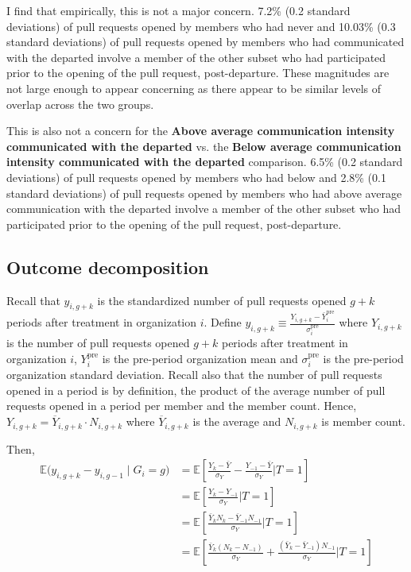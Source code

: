 \documentclass[12pt,notitlepage]{article}
\newcommand{\E}{\mathbb{E}}
\begin{document}
I find that empirically, this is not a major concern. 7.2\% (0.2 standard deviations) of pull requests opened by members who had never and 10.03\% (0.3 standard deviations) of pull requests opened by members who had communicated with the departed involve a member of the other subset who had participated prior to the opening of the pull request, post-departure. These magnitudes are not large enough to appear concerning as there appear to be similar levels of overlap across the two groups. 

This is also not a concern for the \textbf{Above average communication intensity communicated with the departed} vs. the \textbf{Below average communication intensity communicated with the departed} comparison.  6.5\% (0.2 standard deviations) of pull requests opened by members who had below and 2.8\% (0.1 standard deviations) of pull requests opened by members who had above average communication with the departed involve a member of the other subset who had participated prior to the opening of the pull request, post-departure.  


\subsection{Outcome decomposition} \label{sec:outcome_decomp}
Recall that $ y_{i, g+k} $ is the standardized number of pull requests opened $g+k$ periods after treatment in organization $i$. Define $y_{i,g+k}\equiv \frac{Y_{i,g+k}-\bar Y_i^{\mathrm{pre}}}{\sigma_i^{\mathrm{pre}}}$ where $Y_{i,g+k}$ is the number of pull requests opened $g+k$ periods after treatment in organization $i$, $Y_i^{\mathrm{pre}}$ is the pre-period organization mean and $\sigma_i^{\mathrm{pre}}$ is the pre-period organization standard deviation. Recall also that the number of pull requests opened in a period is by definition, the product of the average number of pull requests opened in a period per member and the member count. Hence, $Y_{i,g+k} = \overline{Y}_{i,g+k} \cdot N_{i,g+k}$ where $\overline{Y}_{i,g+k}$ is the average and $N_{i,g+k}$ is member count. 

Then,
\begin{align*} 
\E\bigl(y_{i,g+k} - y_{i,g-1}\mid G_i = g\bigr)&= \mathbb{E}\!\left[\frac{Y_k - \bar{Y}}{\sigma_Y}
 - \frac{Y_{-1} - \bar{Y}}{\sigma_Y}
 \Big| T=1\right] \\
 &= \mathbb{E}\!\left[\frac{Y_k - Y_{-1}}{\sigma_Y}
 \Big| T=1\right] \\
 &= \mathbb{E}\!\left[\frac{\bar{Y}_k N_k - \bar{Y}_{-1}N_{-1}}{\sigma_Y}
 \Big| T=1\right] \\
 &= \mathbb{E}\!\left[\frac{\bar Y_k (N_k - N_{-1})}{\sigma_Y}
 + \frac{(\bar Y_k - \bar Y_{-1}) N_{-1}}{\sigma_Y}
 \Big| T=1\right]
\end{align*}
\end{document}
